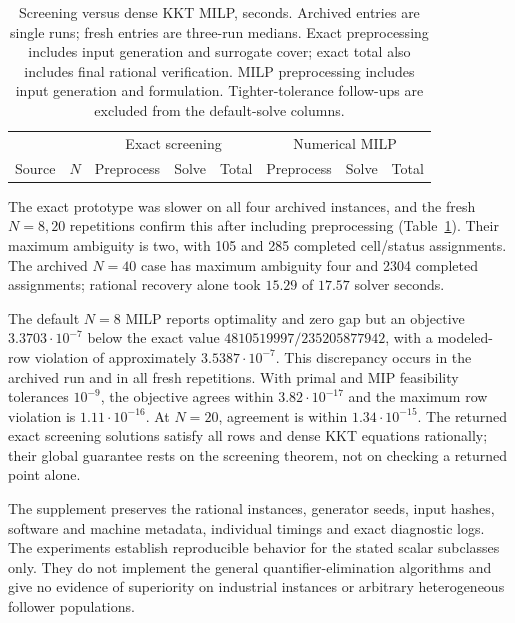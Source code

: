 \begin{table}[t]
\centering\small
\caption{Screening versus dense KKT MILP, seconds. Archived entries are single
runs; fresh entries are three-run medians. Exact preprocessing includes input
generation and surrogate cover; exact total also includes final rational
verification. MILP preprocessing includes input generation and formulation.
Tighter-tolerance follow-ups are excluded from the default-solve columns.}
\label{tab:screening-negative}
\begin{tabular}{llrrrrrr}\toprule
 & &\multicolumn{3}{c}{Exact screening}&\multicolumn{3}{c}{Numerical MILP}\\
Source&$N$&Preprocess&Solve&Total&Preprocess&Solve&Total\\\midrule
\end{tabular}
\end{table}

The exact prototype was slower on all four archived instances, and the fresh
$N=8,20$ repetitions confirm this after including preprocessing
(Table~\ref{tab:screening-negative}). Their maximum ambiguity is two, with
105 and 285 completed cell/status assignments. The archived $N=40$ case has
maximum ambiguity four and 2304 completed assignments; rational recovery alone
took $15.29$ of $17.57$ solver seconds.

The default $N=8$ MILP reports optimality and zero gap but an objective
$3.3703\cdot10^{-7}$ below the exact value
$4810519997/235205877942$, with a modeled-row violation of approximately
$3.5387\cdot10^{-7}$. This discrepancy occurs in the archived run and in
all fresh repetitions. With primal and MIP feasibility tolerances
$10^{-9}$, the objective agrees within $3.82\cdot10^{-17}$ and the maximum
row violation is $1.11\cdot10^{-16}$. At $N=20$, agreement is within $1.34\cdot10^{-15}$. The returned
exact screening solutions satisfy all rows and dense KKT equations rationally;
their global guarantee rests on the screening theorem, not on checking a
returned point alone.

The supplement preserves the rational instances, generator seeds, input
hashes, software and machine metadata, individual timings and exact diagnostic
logs. The experiments establish reproducible behavior for the stated scalar
subclasses only. They do not implement the general quantifier-elimination
algorithms and give no evidence of superiority on industrial instances or
arbitrary heterogeneous follower populations.
